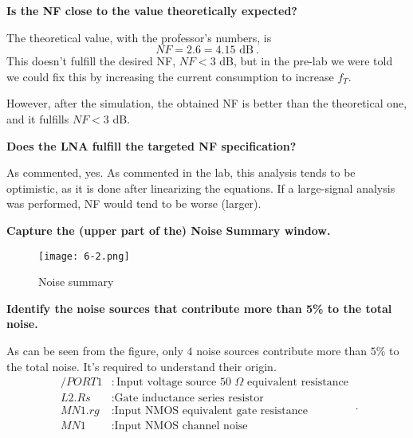 \begin{pexbox}{}
   \noindent \textbf{Is the NF close to the value theoretically expected?}
\end{pexbox}
   
   \noindent The theoretical value, with the professor's numbers, is
   \begin{equation}
      NF = 2.6 = 4.15 \text{ dB} \ .
   \end{equation}
   \noindent This doesn't fulfill the desired NF, $NF < 3$ dB, but in the pre-lab we were told we could fix this by increasing the current consumption to increase $f_T$. 
   
   \noindent However, after the simulation, the obtained NF is better than the theoretical one, and it fulfills $NF < 3$ dB.

\begin{pexbox}{}
   \noindent \textbf{Does the LNA fulfill the targeted NF specification?}
\end{pexbox}

   \noindent As commented, yes. As commented in the lab, this analysis tends to be optimistic, as it is done after linearizing the equations. If a large-signal analysis was performed, NF would tend to be worse (larger).




\begin{pexbox}{}
   \noindent \textbf{Capture the (upper part of the) Noise Summary window.}
\end{pexbox}

\begin{figure} [H] \centering
   \texttt{[image: 6-2.png]}
   \caption{Noise summary}
\end{figure}


\begin{pexbox}{}
   \noindent \textbf{Identify the noise sources that contribute more than 5\% to the total noise.}
\end{pexbox}

   \noindent As can be seen from the figure, only $4$ noise sources contribute more than $5$\% to the total noise. It's required to understand their origin.
   \begin{equation}
      \begin{split}
         /PORT1 &:  \text{Input voltage source 50 $\Omega$ equivalent resistance} \\
         L2.Rs &:  \text{Gate inductance series resistor} \\
         MN1.rg &:  \text{Input NMOS equivalent gate resistance} \\
         MN1 &:  \text{Input NMOS channel noise} \\
      \end{split} \ .
   \end{equation}

